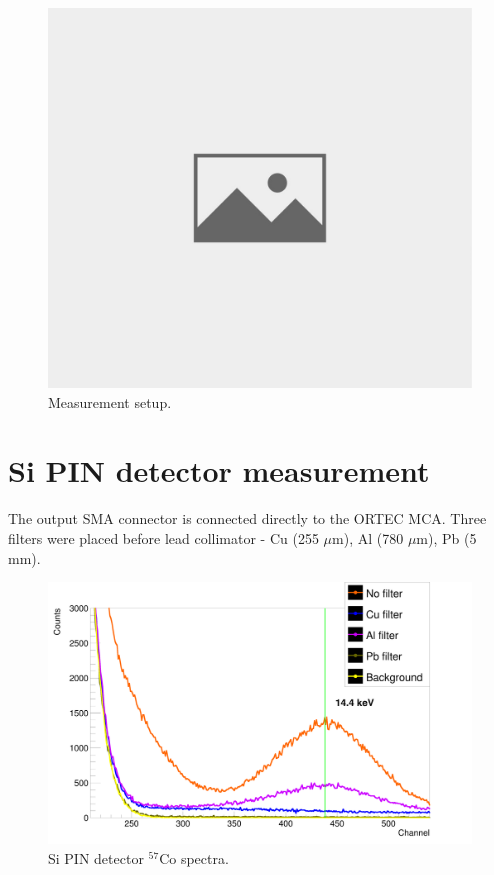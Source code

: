 \begin{figure}[H]
 \centering
 \includegraphics[scale=0.8, angle = 90]{./pictures/NoPicture.jpg}
 \caption{Measurement setup.}
 \label{meas setup}
 
\end{figure}

\section{Si PIN detector measurement}

The output SMA connector is connected directly to the ORTEC MCA.
Three filters were placed before lead collimator - Cu (255 $\mu$m), Al (780 $\mu$m), Pb (5 mm).

\begin{figure}[H]
 \centering
 \includegraphics[scale=0.125, angle = 0]{./pictures/SemiSpectre.png}
 \caption{Si PIN detector $^{57}$Co spectra.}
 \label{Si PIN detector spectra.}
\end{figure}


